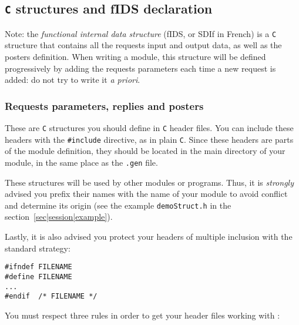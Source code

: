 \subsection{\texttt{C} structures and fIDS declaration}

Note:  the  \emph{functional internal  data  structure} (fIDS, or  SDIf in
French) is  a \texttt{C} structure that  contains all the requests input and
output data,  as well as the  posters definition.  When writing a module,
this structure  will  be defined  progressively  by   adding the requests
parameters each time a new request is added: do not try to write it 
\emph{a priori}.

\subsubsection{Requests parameters, replies and posters}

These are \texttt{C} structures you should define  in \texttt{C} header files.
You can include  these headers with the \texttt{\#include} directive, as in
plain \texttt{C}.  Since these headers are parts  of the  module definition,
they should be located in the main directory  of your module, in the same
place as the \texttt{.gen} file.

These structures will be used by other modules or programs.  Thus, it is
\emph{strongly} advised you prefix their names with the name of your
module to avoid conflict and determine its origin (see the example 
\texttt{demoStruct.h} in the section~\ref{sec|session|example}).

Lastly, it is also advised you protect your headers of multiple inclusion
with the standard strategy:

\begin{center}\begin{cartouche}\small\begin{verbatim}
#ifndef FILENAME
#define FILENAME
...
#endif  /* FILENAME */
\end{verbatim}\end{cartouche}\end{center}

You must respect three rules in order to get your header files working
with \GenoM:

